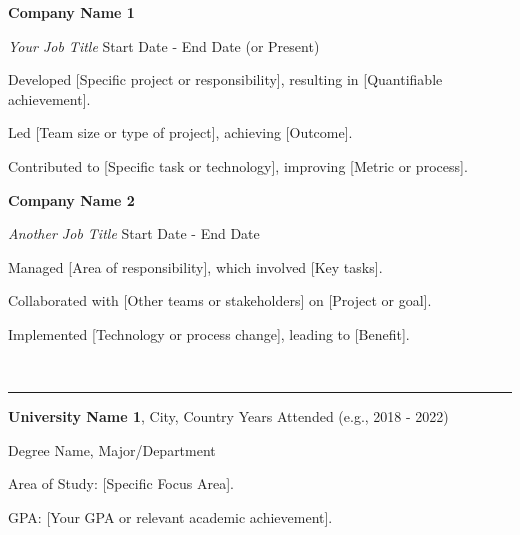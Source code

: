 \documentclass[a4paper]{article}
\newcommand{\cvsection}[1]{%
  \vspace{2mm}%
  \noindent{\Large\bfseries\color{sectionblue} #1}\\[-0.5ex] %
  \noindent\rule{\textwidth}{0.5pt}%
}
\newenvironment{outerlist}[1][\enskip\textbullet] %
  {\begin{compactitem}[#1]}
  {\end{compactitem}}
\newenvironment{innerlist}[1][\enskip\textbullet] %
  {\begin{compactitem}[#1]}
  {\end{compactitem}}
\begin{document}
\textbf{Company Name 1} %
\begin{outerlist}
  \item[] \textit{Your Job Title} \hfill Start Date - End Date (or Present) %
  \begin{innerlist}
    \item Developed [Specific project or responsibility], resulting in [Quantifiable achievement]. %
    \item Led [Team size or type of project], achieving [Outcome].
    \item Contributed to [Specific task or technology], improving [Metric or process].
  \end{innerlist}
\end{outerlist}

\medskip %
\textbf{Company Name 2}
\begin{outerlist}
  \item[] \textit{Another Job Title} \hfill Start Date - End Date
  \begin{innerlist}
    \item Managed [Area of responsibility], which involved [Key tasks].
    \item Collaborated with [Other teams or stakeholders] on [Project or goal].
    \item Implemented [Technology or process change], leading to [Benefit].
  \end{innerlist}
\end{outerlist}

\medskip


\cvsection{Education} %

\textbf{University Name 1}, City, Country  \hfill Years Attended (e.g., 2018 - 2022) %
\begin{outerlist}
  \item[] Degree Name, {Major/Department} %
    \begin{innerlist}
    \item Area of Study: [Specific Focus Area].
    \item GPA: [Your GPA or relevant academic achievement]. %
    \end{innerlist}
\end{outerlist}
\end{document}
